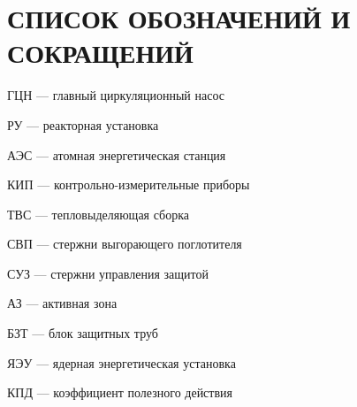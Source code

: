 \section*{СПИСОК ОБОЗНАЧЕНИЙ И СОКРАЩЕНИЙ}
%

\noindent ГЦН — главный циркуляционный насос

\noindent РУ — реакторная установка

\noindent АЭС — атомная энергетическая станция

\noindent КИП — контрольно-измерительные приборы

\noindent ТВС — тепловыделяющая сборка

\noindent СВП — стержни выгорающего поглотителя

\noindent СУЗ — стержни управления защитой

\noindent АЗ — активная зона

\noindent БЗТ — блок защитных труб

\noindent ЯЭУ — ядерная энергетическая установка

\noindent КПД — коэффициент полезного действия



